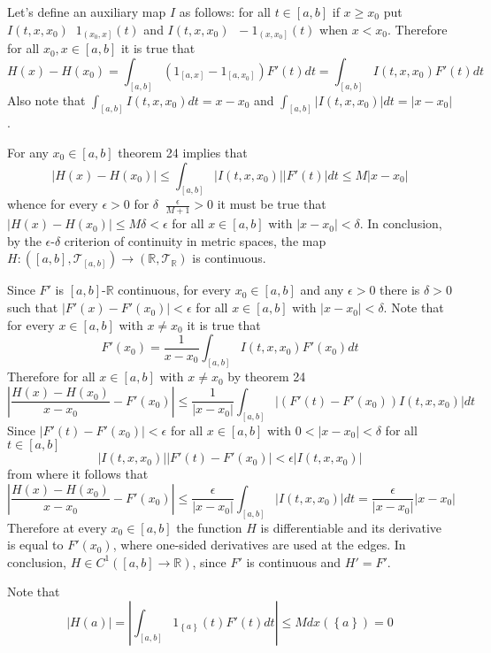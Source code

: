 \documentclass[a4paper]{article}
\newcommand{\obj}[1]{\left\{ #1 \right \}}
\newcommand{\clo}[1]{\left [ #1 \right ]}
\newcommand{\ploc}[1]{\left ( #1 \right ]}
\newcommand{\brac}[1]{\left ( #1 \right )}
\newcommand{\abs}[1]{\left | #1 \right |}
\newcommand{\Real}{\mathbb{R}}
\newcommand{\Tcal}{\mathcal{T}}
\newcommand{\defn}{\mathop{\overset{\Delta}{=}}\nolimits}
\begin{document}
Let's define an auxiliary map $I$ as follows: for all $t\in \clo{a,b}$ if $x\geq x_0$ put $I\brac{t,x,x_0}\defn 1_{\ploc{x_0,x}}\brac{t}$ and $I\brac{t,x,x_0}\defn -1_{\ploc{x,x_0}}\brac{t}$ when $x<x_0$. Therefore for all $x_0, x\in \clo{a,b}$ it is true that \[H\brac{x} - H\brac{x_0} = \int_{\clo{a,b}} \brac{ 1_{\clo{a,x}} - 1_{\clo{a,x_0}} } F'\brac{t} dt = \int_{\clo{a,b}} I\brac{t,x,x_0} F'\brac{t} dt\] Also note that $\int_{\clo{a,b}} I\brac{t,x,x_0} dt = x-x_0$ and $\int_{\clo{a,b}} \abs{I\brac{t,x,x_0}} dt = \abs{x-x_0}$.

For any $x_0\in \clo{a,b}$ theorem 24 implies that \[\abs{H\brac{x}-H\brac{x_0}}\leq \int_{\clo{a,b}} \abs{I\brac{t,x,x_0}} \abs{F'\brac{t}} dt\leq M \abs{x-x_0}\] whence for every $\epsilon>0$ for $\delta\defn\frac{\epsilon}{M+1}>0$ it must be true that $\abs{H\brac{x}-H\brac{x_0}}\leq M \delta < \epsilon$ for all $x\in \clo{a,b}$ with $\abs{x-x_0}<\delta$. In conclusion, by the $\epsilon$-$\delta$ criterion of continuity in metric spaces, the map $H:\brac{\clo{a,b}, \Tcal_{\clo{a,b}}}\to\brac{\Real, \Tcal_\Real}$ is continuous.

Since $F'$ is $\clo{a,b}$-$\Real$ continuous, for every $x_0 \in \clo{a,b}$ and any $\epsilon>0$ there is $\delta>0$ such that $\abs{F'\brac{x}-F'\brac{x_0}}<\epsilon$ for all $x\in \clo{a,b}$ with $\abs{x-x_0}<\delta$. Note that for every $x\in \clo{a,b}$ with $x\neq x_0$ it is true that \[ F'\brac{x_0} = \frac{1}{x-x_0}\int_{\clo{a,b}} I\brac{t,x,x_0} F'\brac{x_0} dt\] Therefore for all $x\in \clo{a,b}$ with $x\neq x_0$ by theorem 24 \[\abs{ \frac{H\brac{x}-H\brac{x_0}}{x-x_0} - F'\brac{x_0} } \leq \frac{1}{\abs{x-x_0}} \int_{\clo{a,b}} \abs{\brac{F'\brac{t} - F'\brac{x_0}} I\brac{t,x,x_0} } dt\] %
Since $\abs{F'\brac{t} - F'\brac{x_0}}<\epsilon$ for all $x\in \clo{a,b}$ with $0<\abs{x-x_0}<\delta$ for all $t\in \clo{a,b}$ \[\abs{I\brac{t,x,x_0}} \abs{F'\brac{t} - F'\brac{x_0} }<\epsilon \abs{I\brac{t,x,x_0}}\] from where it follows that \[\abs{ \frac{H\brac{x}-H\brac{x_0}}{x-x_0} - F'\brac{x_0} } \leq \frac{\epsilon}{\abs{x-x_0}} \int_{\clo{a,b}} \abs{I\brac{t,x,x_0}} dt = \frac{\epsilon}{\abs{x-x_0}}\abs{x-x_0}\] Therefore at every $x_0\in \clo{a,b}$ the function $H$ is differentiable and its derivative is equal to $F'\brac{x_0}$, where one-sided derivatives are used at the edges. In conclusion, $H\in C^1\brac{\clo{a,b}\to \Real}$, since $F'$ is continuous and $H'=F'$.

Note that \[\abs{H\brac{a}} = \abs{ \int_{\clo{a,b}} 1_{\obj{a}}\brac{t} F'\brac{t} dt }\leq M dx\brac{\obj{a}} = 0\]
\end{document}

